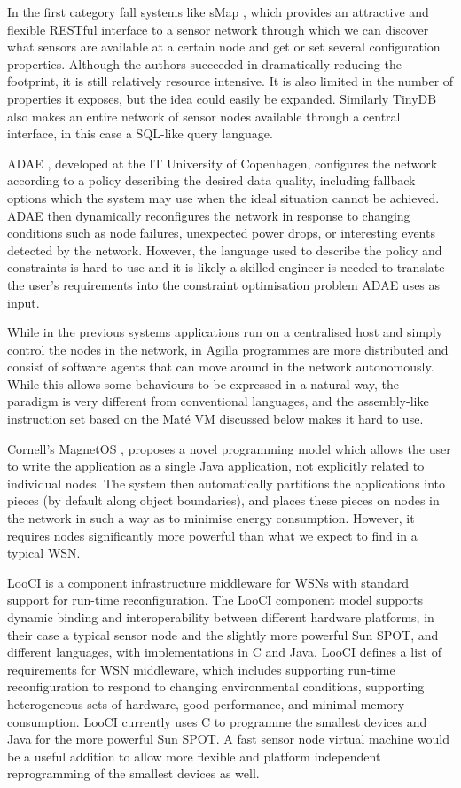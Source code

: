 In the first category fall systems like sMap \cite{DawsonHaggerty:2010eo}, which provides an attractive and flexible RESTful interface to a sensor network through which we can discover what sensors are available at a certain node and get or set several configuration properties. Although the authors succeeded in dramatically reducing the footprint, it is still relatively resource intensive. It is also limited in the number of properties it exposes, but the idea could easily be expanded. Similarly TinyDB \cite{Madden:2005tj} also makes an entire network of sensor nodes available through a central interface, in this case a SQL-like query language.

ADAE \cite{Chang:2010ek}, developed at the IT University of Copenhagen, configures the network according to a policy describing the desired data quality, including fallback options which the system may use when the ideal situation cannot be achieved. ADAE then dynamically reconfigures the network in response to changing conditions such as node failures, unexpected power drops, or interesting events detected by the network. However, the language used to describe the policy and constraints is hard to use and it is likely a skilled engineer is needed to translate the user's requirements into the constraint optimisation problem ADAE uses as input.

While in the previous systems applications run on a centralised host and simply control the nodes in the network, in Agilla \cite{Fok:2005bh} programmes are more distributed and consist of software agents that can move around in the network autonomously. While this allows some behaviours to be expressed in a natural way, the paradigm is very different from conventional languages, and the assembly-like instruction set based on the Maté VM \cite{Levis:2002ku} discussed below makes it hard to use.

Cornell's MagnetOS \cite{Liu:2005wsa}, proposes a novel programming model which allows the user to write the application as a single Java application, not explicitly related to individual nodes. The system then automatically partitions the applications into pieces (by default along object boundaries), and places these pieces on nodes in the network in such a way as to minimise energy consumption. However, it requires nodes significantly more powerful than what we expect to find in a typical WSN.

LooCI \cite{Hughes:dg} is a component infrastructure middleware for WSNs with standard support for run-time reconfiguration. The LooCI component model supports dynamic binding and interoperability between different hardware platforms, in their case a typical sensor node and the slightly more powerful Sun SPOT, and different languages, with implementations in C and Java. LooCI defines a list of requirements for WSN middleware, which includes supporting run-time reconfiguration to respond to changing environmental conditions, supporting heterogeneous sets of hardware, good performance, and minimal memory consumption. LooCI currently uses C to programme the smallest devices and Java for the more powerful Sun SPOT. A fast sensor node virtual machine would be a useful addition to allow more flexible and platform independent reprogramming of the smallest devices as well.

